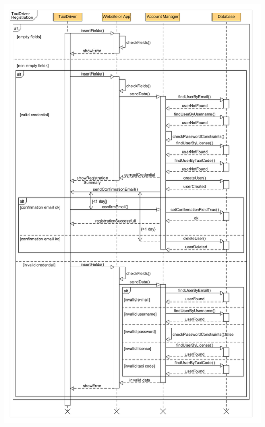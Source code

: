 		\begin{center}
			\includegraphics[width=\textwidth]{diagrams/TaxiDriverRegistration.png}
		\end{center}

